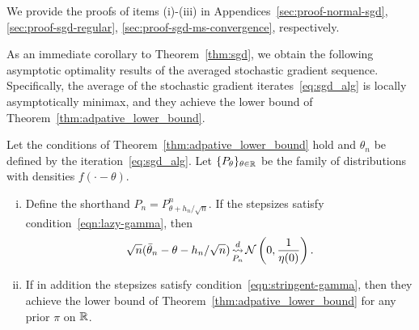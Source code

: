 \noindent
We provide the proofs of items (i)-(iii) in Appendices~\ref{sec:proof-normal-sgd},
\ref{sec:proof-sgd-regular}, \ref{sec:proof-sgd-ms-convergence},
respectively.

As an immediate corollary to Theorem~\ref{thm:sgd}, we obtain the following
asymptotic optimality results of the averaged stochastic gradient
sequence. Specifically, the average of the stochastic gradient
iterates~\eqref{eq:sgd_alg}
is locally asymptotically minimax, and they achieve the lower
bound of Theorem~\ref{thm:adpative_lower_bound}.

\begin{corollary}
  Let the conditions of Theorem~\ref{thm:adpative_lower_bound} hold
  and $\theta_n$ be defined by the iteration~\eqref{eq:sgd_alg}.
  Let $\{P_\theta\}_{\theta \in \mathbb{R}}$ be the family of distributions
  with densities $f(\cdot - \theta)$.
  \begin{enumerate}[(i)]
  \item Define the shorthand $P_n = P_{\theta + h_n/\sqrt{n}}^n$.
    If the stepsizes satisfy condition~\eqref{eqn:lazy-gamma}, then
    \begin{equation*}
      \sqrt{n}(\bar{\theta}_n - \theta - h_n / \sqrt{n})
      \mathop{\stackrel{d}{\rightsquigarrow}}_{P_n} \mathcal{N}\left(0, \frac{1}{\eta(0)}\right).
    \end{equation*}
  \item If in addition the stepsizes satisfy
    condition~\eqref{eqn:stringent-gamma}, then they
    achieve the lower bound of Theorem~\ref{thm:adpative_lower_bound} for any
    prior $\pi$ on $\mathbb{R}$.
  \end{enumerate}
\end{corollary}

